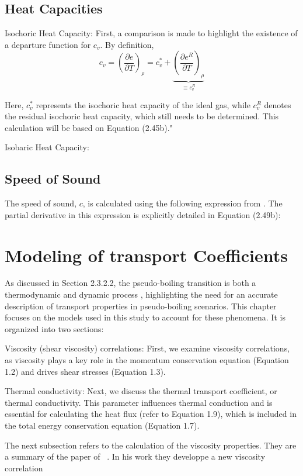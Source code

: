 \subsection{Heat Capacities}
Isochoric Heat Capacity: First, a comparison is made to highlight the existence
of a departure function for $c_v$. By definition,
\begin{equation}
c_v = \left( \frac{\partial e}{\partial T} \right)_\rho = c_v^* + \underbrace{\left( \frac{\partial e^R}{\partial T} \right)_\rho}_{\equiv c_v^R}
\end{equation}

Here, $c_v^*$ represents the isochoric heat capacity of the ideal gas, while
$c_v^R$ denotes the residual isochoric heat capacity, which still needs to be
determined. This calculation will be based on Equation (2.45b)."

Isobaric Heat Capacity: 

\subsection{Speed of Sound}
The speed of sound, $c$, is calculated using the following expression from
\cite{riazi1993use}. The partial derivative in this expression is explicitly
detailed in Equation (2.49b):

\section{Modeling of transport Coefficients}
As discussed in Section 2.3.2.2, the pseudo-boiling transition is both a
thermodynamic and dynamic process \cite{banuti2020between}, highlighting the
need for an accurate description of transport properties in pseudo-boiling
scenarios. This chapter focuses on the models used in this study to account for
these phenomena. It is organized into two sections:

Viscosity (shear viscosity) correlations: First, we examine viscosity
correlations, as viscosity plays a key role in the momentum conservation
equation (Equation 1.2) and drives shear stresses (Equation 1.3).

Thermal conductivity: Next, we discuss the thermal transport coefficient, or
thermal conductivity. This parameter influences thermal conduction and is
essential for calculating the heat flux (refer to Equation 1.9), which is
included in the total energy conservation equation (Equation 1.7).

The next subsection refers to the calculation of the viscosity properties. They
are a summary of the paper of ~\cite{}. In his work they developpe a new
viscosity correlation

